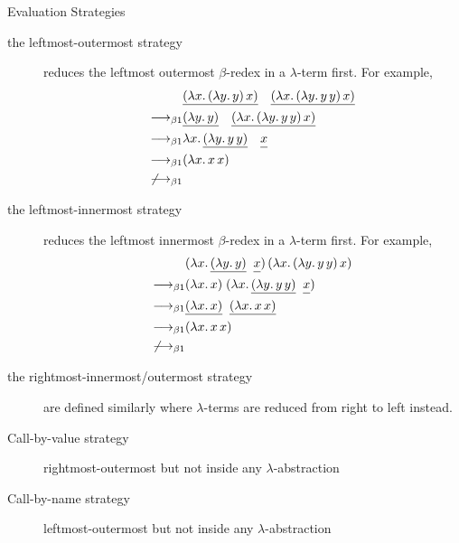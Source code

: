 \begin{frame}[allowframebreaks]{Evaluation Strategies}
\begin{description}
  \item[the leftmost-outermost strategy] reduces the leftmost outermost
    $\beta$-redex in a $\lambda$-term first. For example, 
    \begin{align*}
      & 
      \underline{(\lambda x.\, (\lambda y.\, y)\,x)}\quad
      \underline{(\lambda x.\, (\lambda y.\, y\,y)\,x)}
      \\
      \longrightarrow_{\beta1} &
      \underline{(\lambda y.\, y)}\quad
      \underline{(\lambda x.\, (\lambda y.\, y\,y)\, x)} \\
      \longrightarrow_{\beta1} &
      \lambda x.\, \underline{(\lambda y.\, y\,y)}\quad
      \underline{\vphantom{(\lambda}x} \\
      \longrightarrow_{\beta1} & (\lambda x.\, x\,x) \\
      \not\longrightarrow_{\beta1}
    \end{align*}
  \item[the leftmost-innermost strategy] reduces the leftmost innermost
    $\beta$-redex in a $\lambda$-term first. For example, 
    \begin{align*}
      & (\lambda x.\, \underline{(\lambda y.\,
        y)}\;\;\underline{\vphantom{(\lambda} x})\,
      (\lambda x.\, (\lambda y.\, y\, y)\,x) \\
      \longrightarrow_{\beta1} & (\lambda x.\,x)\;
      (\lambda x.\, \underline{(\lambda y.\, y\,
        y)}\;\;\underline{\vphantom{(\lambda}x}) \\
      \longrightarrow_{\beta1} & \underline{(\lambda x.\,x)}\;\;\underline{(\lambda x.\, x\,x)} \\
      \longrightarrow_{\beta1} & (\lambda x.\, x\, x) \\
      \not\longrightarrow_{\beta1}
    \end{align*}
  \item[the rightmost-innermost/outermost strategy]
    are defined similarly where $\lambda$-terms are reduced from right to left
    instead.
\end{description}
\begin{description}
  \item[Call-by-value strategy]
    rightmost-outermost but not inside any $\lambda$-abstraction
  \item[Call-by-name strategy]
    leftmost-outermost but not inside any $\lambda$-abstraction
\end{description}


\end{frame}
